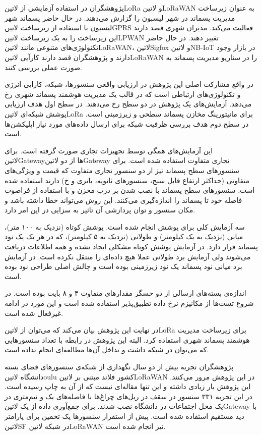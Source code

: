 
پژوهشگران در  استفاده آزمایشی از ‌لاتین{LoRa} و ‌لاتین{LoRaWAN} به عنوان زیرساخت مدیریت پسماند در شهر لیسبون را گزارش می‌دهند.
در حال حاضر پسماند شهر لیسبون با استفاده از زیرساخت ‌لاتین{GPRS} فعالیت می‌کند. مدیران شهری قصد دارند این زیرساخت را به یک زیرساخت ‌لاتین{LPWAN} تغییر دهند.
در حال حاضر تکنولوژی‌های متنوعی مانند ‌لاتین{LoRaWAN}، ‌لاتین{Sigfox} و ‌لاتین{NB-IoT} در بازار وجود دارند و پژوهشگران قصد دارند کارآیی ‌لاتین{LoRaWAN} را در
سناریو مدیریت پسماند به صورت عملی بررسی کنند.

در واقع مشارکت اصلی این پژوهش در ارزیابی واقعی سنسورها، شبکه، کارایی انرژی و تکنولوژی‌های ارتباطی است که در قالب یک مدیریت هوشمند پسماند شهری رخ می‌دهد.
آزمایش‌های یک پژوهش در دو سطح رخ می‌دهند. در سطح اول هدف ارزیابی پوشش شبکه‌ای ‌لاتین{LoRa} برای مانیتورینگ مخازن پسماند سطحی و زیرزمینی است.
در سطح دوم هدف بررسی ظرفیت شبکه برای ارسال داده‌های مورد نیاز اپلیکشن‌ها است.

این آزمایش‌های همگی توسط تجهیزات تجاری صورت گرفته است. برای ‌لاتین{Gateway}ها از دو ‌لاتین{Gateway} تجاری متفاوت استفاده شده است.
برای سنسورهای سطح پسماند نیز از دو سنسور تجاری متفاوت که قیمت و ویژگی‌های متفاوتی (حداکثر ارتفاع قابل سنج، سنسورهای ثانویه، باتری و ‌خ) دارند استفاده شده است.
سنسورهای سطح پسماند با نصب شدن بر درب مخزن و با استفاده از فراصوت فاصله خود تا پسماند را اندازه‌گیری می‌کنند. این روش می‌تواند خطا داشته باشد
و مکان سنسور و توان پردازشی آن تاثیر به سزایی در این امر دارد.

سه آزمایش کلی برای پوشش انجام شده است. پوشش کوتاه (نزدیک به ۱۰۰ متر)، میانی (نزدیک به یک کیلومتر) و طولانی (نزدیک به ۵ کیلومتر)، که در هر یک یک نود پسماند قرار دارد.
در آزمایش پوشش کوتاه مشکلی ایجاد نشده و همه اطلاعات دریافت می‌شوند ولی آزمایش برد طولانی عملا هیچ داده‌ای را منتقل نکرده است.
در آزمایش برد میانی نود پسماند یک نود زیرزمینی بوده است و چالش اصلی طراحی نود بوده است.

اندازه‌ی بسته‌های ارسالی از دو حسگر مقدارهای متفاوت ۴ و ۸ بایت بوده است. در شروع تست‌ها از مکانیزم نرخ داده تطبیق‌پذیر استفاده شده است و این مورد در ادامه غیرفعال شده است.

در نهایت این پژوهش بیان می‌کند که می‌توان از ‌لاتین{LoRa} برای زیرساخت مدیریت هوشمند پسماند شهری استفاده کرد.
البته این پژوهش در رابطه با تعداد سنسورهایی که می‌توان در شبکه داشت و تداخل آن‌ها مطالعه‌ای انجام نداده است.


پژوهشگران  تجربه بیش از دو سال نگهداری از شبکه‌ی سنسورهای فضای بسته دانشگاه ‌لاتین{oulu} کشور فلاند مبتنی بر ‌لاتین{LoRaWAN} در این پژوهش مرور می‌کنند.
این پژوهش بار زیادی داشته و این تنها مقاله‌ای نیست که از آن به چاپ رسیده است. در این تجربه ۳۳۱ سنسور در سقف در ریل‌های چراغ‌ها با فاصله‌های یک و نیم‌متری در یک محل اجتماعات در دانشگاه نصب شدند.
برای جمع‌آوری داده از یک ‌لاتین{Gateway} با دید مستقیم استفاده شده است. پیش از استقرار سنسورها یک تخمین برای پارامتر ‌لاتین{SF} در شبکه ‌لاتین{LoRaWAN} نیز انجام شده است.

